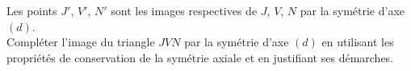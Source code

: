 \begin{Exemple}
 Les points $J'$, $V'$, $N'$ sont les images respectives de $J$, $V$, $N$ par la symétrie d'axe $(d)$.\\Compléter l'image du triangle $JVN$ par la symétrie d'axe $(d)$ en utilisant les propriétés de conservation de la symétrie axiale et en justifiant ses démarches.\\
 \begin{minipage}[c]{0.5\textwidth}
 \vspace*{0.3cm}
 
\ligne

\ligne

\ligne

\ligne

\ligne

\ligne

\ligne

\ligne
 \end{minipage} \hfill  \begin{minipage}[c]{0.5\textwidth}
 \begin{center}
 \begin{tikzpicture}[baseline,scale=0.4,transform shape]


\end{tikzpicture}
\end{center}
\end{minipage}
\end{Exemple}
